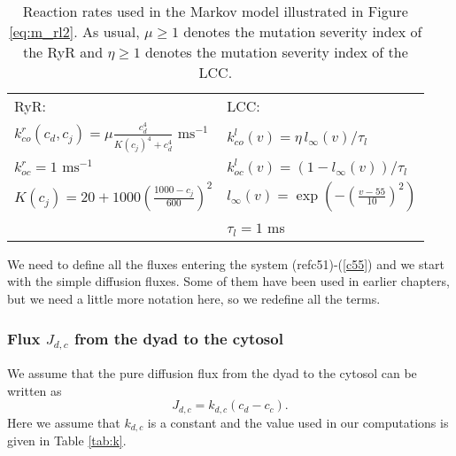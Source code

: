 
\begin{table}
\begin{center}
\begin{tabular}[c]{|l|l|} \hline
RyR: & LCC: \\
$k_{co}^{r}(c_d,c_j)=\mu \frac{c_d^4}{K(c_j)^4+c_d^4} \text{ ms}^{-1}$ &$k_{co}^{l}(v)=\eta\, l_{\infty}(v)/\tau_l$ \\
$k_{oc}^{r}=1 \text{ ms}^{-1}$ & $k_{oc}^{l}(v)=(1-l_{\infty}(v))/\tau_l$ \\
$K(c_j) = 20+1000(\frac{1000-c_j}{600})^2$ &  $ l_{\infty}(v) = \exp(-(\frac{v-55}{10})^2)$ \\
 & $\tau_l=1$ ms\\ \hline
\end{tabular}
\end{center}
\caption{Reaction rates used in the Markov model illustrated in
Figure \ref{eq:m_rl2}.
As usual,  $\mu \ge 1$ denotes the mutation severity
index of the RyR and $\eta \ge 1$ denotes the mutation severity
index of the LCC. }
\label{functions2}
\end{table}

We need to define all the fluxes entering the system (ref{c51})-(\ref{c55}) and we start with the simple diffusion fluxes. Some of
them have been used in earlier chapters, but we need a little more notation
here, so we redefine all the terms.

\subsubsection{Flux $J_{d,c}$ from the dyad to the cytosol}
We assume that the pure diffusion flux
from the dyad to the cytosol can be written as
\begin{equation}
J_{d,c}=k_{d,c}\left(  c_{d}-c_{c}\right).
 \label{J_dc}
\end{equation}
Here we assume that $k_{d,c}$ is a constant and the value used in our computations is given in Table \ref{tab:k}.


